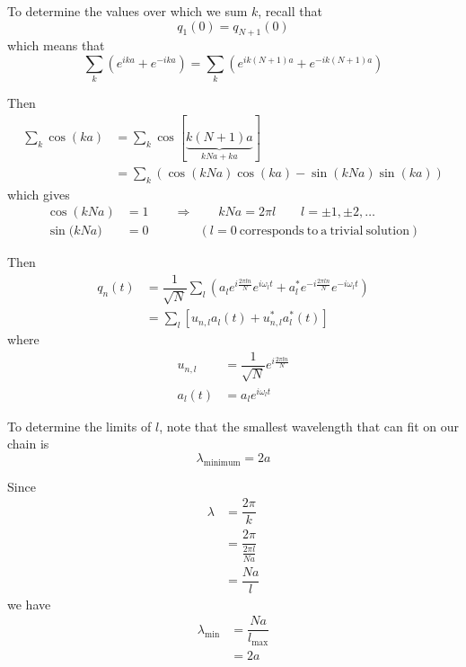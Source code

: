 \documentclass{article}
\begin{document}

\noindent To determine the values over which we sum $k$, recall that
\begin{equation*}
    q_1 (0) = q_{N+1} (0)
\end{equation*}
which means that
\begin{equation*}
    \sum_k \left( e^{ i k a } + e^{ -i k a } \right) = \sum_k \left( e^{ i k (N+1) a } + e^{ -i k (N+1) a } \right)
\end{equation*}

\noindent Then
\begin{align*}
    \sum_k \cos{(ka)} &= \sum_k \cos{[\underbrace{ k (N+1) a}_{ k N a + k a }]} \\
    &= \sum_k \left( \cos{(kNa)} \cos{(ka)} - \sin{(kNa)} \sin{(ka)} \right)
\end{align*}
which gives
\begin{align*}
    \cos{(kNa)} &= 1 \qquad \Longrightarrow \qquad k N a = 2 \pi l \qquad l = \pm 1, \pm 2, \dots \\
    \sin{(kNa}) &= 0 \qquad \qquad ( l = 0 ~ \mathrm{corresponds} ~ \mathrm{to} ~ \mathrm{a} ~ \mathrm{trivial} ~ \mathrm{solution} )
\end{align*}

\noindent Then
\begin{align*}
    q_n (t) &= \dfrac{1}{\sqrt{N}} \sum_l \left( a_l e^{ i \frac{2 \pi l n}{N}} e^{ i \omega_l t } + a_l^* e^{ -i \frac{2 \pi l n}{N}} e^{ -i \omega_l t } \right) \\
    &= \sum_l \left[ u_{n,l} a_l (t) + u_{n,l}^* a_l^* (t) \right]
\end{align*}
where
\begin{align*}
    u_{n,l} &= \dfrac{1}{\sqrt{N}} e^{ i \frac{ 2 \pi l n }{N} } \\
    a_l (t) &= a_l e^{ i \omega_l t }
\end{align*}


\noindent To determine the limits of $l$, note that the smallest wavelength that can fit on our chain is
\begin{equation*}
    \lambda_\mathrm{minimum} = 2a
\end{equation*}

\noindent Since
\begin{align*}
    \lambda &= \dfrac{2 \pi}{k} \\
    &= \dfrac{2 \pi}{\frac{2 \pi l}{ N a }} \\
    &= \dfrac{Na}{l}
\end{align*}
we have
\begin{align*}
    \lambda_\mathrm{min} &= \dfrac{N a}{l_\mathrm{max}} \\
    &= 2a
\end{align*}
\end{document}
